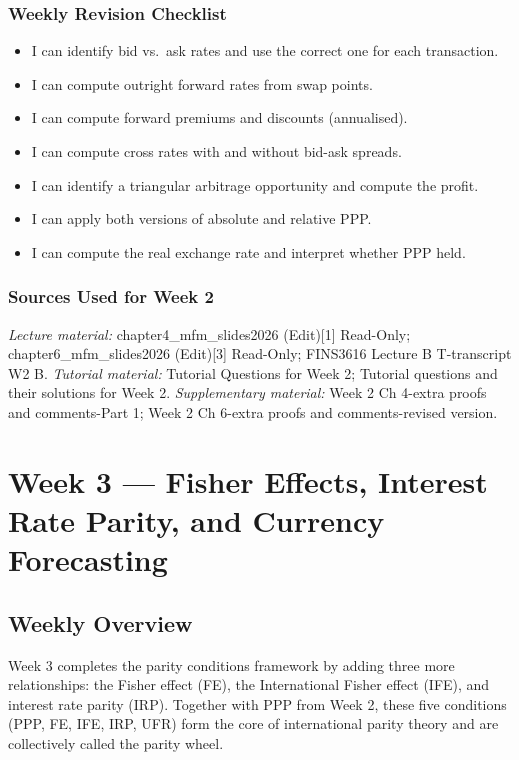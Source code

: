 \documentclass[11pt,a4paper]{article}
\newcommand{\cb}{\(\square\)\enspace}
\begin{document}
\subsubsection*{Weekly Revision Checklist}
\begin{itemize}[leftmargin=2em]
  \item[\cb] I can identify bid vs.\ ask rates and use the correct one for each transaction.
  \item[\cb] I can compute outright forward rates from swap points.
  \item[\cb] I can compute forward premiums and discounts (annualised).
  \item[\cb] I can compute cross rates with and without bid-ask spreads.
  \item[\cb] I can identify a triangular arbitrage opportunity and compute the profit.
  \item[\cb] I can apply both versions of absolute and relative PPP.
  \item[\cb] I can compute the real exchange rate and interpret whether PPP held.
\end{itemize}

\subsubsection*{Sources Used for Week 2}
{\sloppy\textit{Lecture material:} chapter4\_mfm\_slides2026 (Edit)[1] Read-Only; chapter6\_mfm\_slides2026 (Edit)[3] Read-Only; FINS3616 Lecture B T-transcript W2 B\@. \textit{Tutorial material:} Tutorial Questions for Week 2; Tutorial questions and their solutions for Week 2. \textit{Supplementary material:} Week 2 Ch 4-extra proofs and comments-Part 1; Week 2 Ch 6-extra proofs and comments-revised version.\par}

\newpage

\section{Week 3 — Fisher Effects, Interest Rate Parity, and Currency Forecasting}

\subsection{Weekly Overview}

Week 3 completes the parity conditions framework by adding three more relationships: the Fisher effect (FE), the International Fisher effect (IFE), and interest rate parity (IRP). Together with PPP from Week 2, these five conditions (PPP, FE, IFE, IRP, UFR) form the core of international parity theory and are collectively called the parity wheel.
\end{document}
